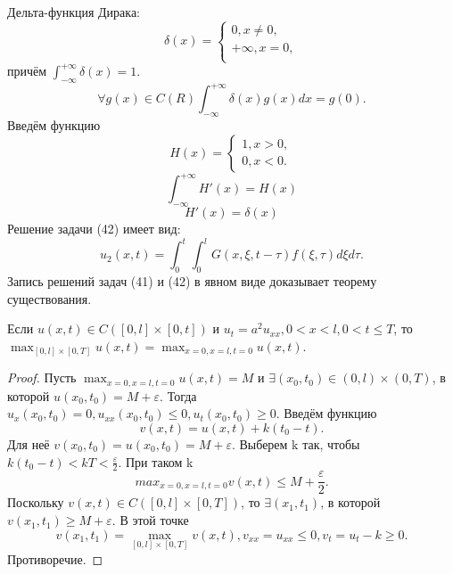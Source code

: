 \documentclass[11pt]{article}
\newcounter{th}\setcounter{th}{0}
\def\th{\par\smallskip\refstepcounter{th}\textbf{\arabic{th}}}
\newtheorem*{Theorem}{Теорема \th}
\begin{document}
Дельта-функция Дирака:
\begin{equation}
\delta(x) = \begin{cases}
0, x \neq 0, \\
+\infty, x = 0, \\
\end{cases}
\end{equation}
причём $\int_{-\infty}^{+\infty}\delta(x) = 1$.
$$\forall g(x) \in C(R) \int_{-\infty}^{+\infty}\delta(x)g(x)dx = g(0).$$
Введём функцию
\begin{equation}
H(x) =
\begin{cases}
1, x > 0, \\
0, x < 0.
\end{cases}
\end{equation}
$$\int_{-\infty}^{+\infty}H'(x) = H(x)$$
$$H'(x) = \delta(x)$$
Решение задачи (42) имеет вид:
\begin{equation}
u_2(x, t) = \int_0^t\int_0^lG(x, \xi, t - \tau)f(\xi, \tau)d\xi d\tau.
\end{equation}
Запись решений задач (41) и (42) в явном виде доказывает теорему существования.
\begin{Theorem}
Если $u(x, t) \in C([0, l] \times [0, t])$ и $u_t = a^2u_{xx}, 0 < x < l, 0 < t \leq T$, то
$\max_{[0, l] \times [0, T]}u(x, t) = \max_{x = 0, x = l, t = 0}u(x, t)$.
\begin{proof}
Пусть $\max_{x = 0, x = l, t = 0}u(x, t) = M$ и $\exists (x_0, t_0) \in (0, l) \times (0, T)$, в
которой $u(x_0, t_0) = M + \varepsilon$. Тогда $u_x(x_0, t_0) = 0, u_{xx}(x_0, t_0) \leq 0, u_t(x_0, t_0) \geq 0$.
Введём функцию
\begin{equation}
v(x, t) = u(x, t) + k(t_0 - t).
\end{equation}
Для неё $v(x_0, t_0) = u(x_0, t_0) = M + \varepsilon$. Выберем k так, чтобы $k(t_0 - t) < kT < \frac{\varepsilon}2$.
При таком k
\begin{equation}
max_{x = 0, x = l, t = 0}v(x, t) \leq M + \frac{\varepsilon}2.
\end{equation}
Поскольку $v(x, t) \in C([0, l]\times[0, T])$, то $\exists (x_1, t_1)$, в которой $v(x_1, t_1) \geq M + \varepsilon$.
В этой точке
\begin{equation}
v(x_1, t_1) = \max_{[0, l]\times[0, T]}v(x, t), v_{xx} = u_{xx} \leq 0, v_t = u_t - k \geq 0.
\end{equation}
Противоречие.
\end{proof}
\end{Theorem}
\end{document}

